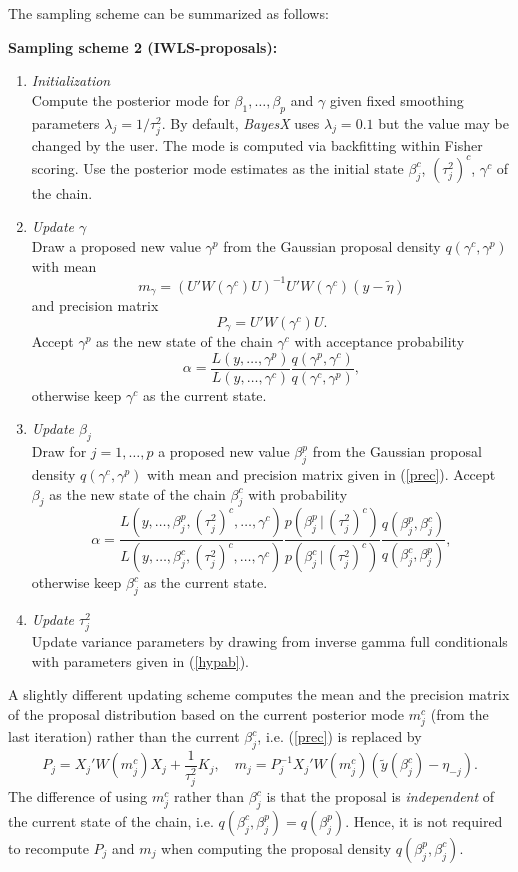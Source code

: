 \documentclass[11pt,a4paper,twoside]{bayesxarticle}
\begin{document}
The sampling scheme can be summarized as follows:

{\bf Sampling scheme 2 (IWLS-proposals):}
\begin{enumerate}
\item {\em Initialization} \\
Compute the posterior mode for $\beta_1,\dots,\beta_p$ and $\gamma$
given fixed smoothing parameters $\lambda_j = 1/\tau^2_j$. By
default, {\em BayesX} uses $\lambda_j = 0.1$ but the value may be
changed by the user. The mode is computed via backfitting within
Fisher scoring. Use the posterior mode estimates as the initial
state $\beta_j^c$, $(\tau_j^2)^c$, $\gamma^c$ of the chain.
\item {\em Update $\gamma$} \\
Draw a proposed new value $\gamma^p$ from the Gaussian proposal
density $q(\gamma^c,\gamma^p)$ with mean
$$
m_{\gamma} = (U' W(\gamma^c) U)^{-1}U' W(\gamma^c) (y-\tilde{\eta}
)
$$
and precision matrix
$$
P_{\gamma} = U' W(\gamma^c) U.
$$
Accept $\gamma^p$ as the new state of the chain $\gamma^c$ with
acceptance probability
$$
\alpha = \frac{ L(y,\dots,\gamma^p)} {L(y,\dots,\gamma^c)} \frac{
q(\gamma^p,\gamma^c)}{q(\gamma^c,\gamma^p)},
$$
otherwise keep $\gamma^c$ as the current state.
\item {\em Update $\beta_j$} \\
Draw for $j=1,\dots,p$ a proposed new value $\beta_j^p$ from the
Gaussian proposal density $q(\gamma^c,\gamma^p)$ with mean and
precision matrix given in (\ref{prec}). Accept $\beta_j$ as the
new state of the chain $\beta_j^c$ with probability
$$
\alpha = \frac{
L(y,\dots,\beta^{p}_j,(\tau_j^2)^{c},\dots,\gamma^c)}
{L(y,\dots,\beta^{c}_j,(\tau_j^2)^{c},\dots,\gamma^c)}
\frac{p(\beta_j^p \, | \, (\tau_j^2)^c)}{p(\beta_j^c \, | \,
(\tau_j^2)^c)} \frac{
q(\beta_j^p,\beta_j^c)}{q(\beta_j^c,\beta_j^p)},
$$
otherwise keep $\beta_j^c$ as the current state.
\item {\em Update $\tau^2_j$} \\
Update variance parameters by drawing from inverse gamma full
conditionals with parameters given in (\ref{hypab}).
\end{enumerate}

A slightly different updating scheme computes the mean and the
precision matrix of the proposal distribution based on the current
posterior mode $m_j^c$ (from the last iteration) rather than the
current $\beta_j^c$, i.e. (\ref{prec}) is replaced by
\begin{equation}
\label{precmode} P_j = X_j'W(m_j^c)X_j + \frac{1}{\tau^2_j}K_j,
\quad m_j = P_j^{-1}X_j'W(m_j^c)(\tilde{y}(\beta^c_j) - \eta_{-j}).
\end{equation}
The difference of using $m_j^c$ rather than $\beta_j^c$ is that
the proposal is {\em independent} of the current state of the
chain, i.e. $q(\beta_j^c,\beta_j^p) = q(\beta_j^p)$. Hence, it is
not required to recompute $P_j$ and $m_j$ when computing the
proposal density $q(\beta_j^p,\beta_j^c)$.
\end{document}
